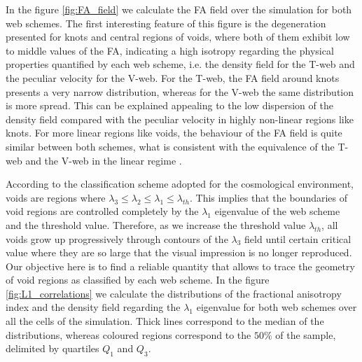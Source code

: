 \documentclass[a4,useAMS,usenatbib,usegraphicx]{latex/mn2e}
\begin{document}
In the figure \ref{fig:FA_field} we calculate the FA field over the 
simulation for both web schemes. The first interesting feature of this
figure is the degeneration presented for knots and central regions of 
voids, where both of them exhibit low to middle values of the FA, 
indicating a high isotropy regarding the physical properties quantified by 
each web scheme, i.e. the density field for the T-web and the peculiar 
velocity for the V-web. For the T-web, the FA field around knots presents 
a very narrow distribution, whereas for the V-web the same distribution is
more spread. This can be explained appealing to the low dispersion of the 
density field compared with the peculiar velocity in highly non-linear 
regions like knots. For more linear regions like voids, the behaviour of 
the FA field is quite similar between both schemes, what is consistent 
with the equivalence of the T-web and the V-web in the linear regime 
.


According to the classification scheme adopted for the cosmological 
environment, voids are regions where 
$\lambda_3\leq\lambda_2\leq\lambda_1\leq\lambda_{th}$. This implies that
the boundaries of void regions are controlled completely by the $\lambda_1$
eigenvalue of the web scheme and the threshold value. Therefore, as we 
increase the threshold value $\lambda_{th}$, all voids grow up 
progressively through contours of the $\lambda_3$ field until certain 
critical value where they are so large that the visual impression is no 
longer reproduced. Our objective here is to find a reliable quantity that 
allows to trace the geometry of void regions as classified by each web 
scheme. In the figure \ref{fig:L1_correlations} we calculate the 
distributions of the fractional anisotropy index and the density field 
regarding the $\lambda_1$ eigenvalue for both web schemes over all the 
cells of the simulation. Thick lines correspond to the median of the 
distributions, whereas coloured regions correspond to the $50\%$ of the
sample, delimited by quartiles $Q_1$ and $Q_3$. 
\end{document}
